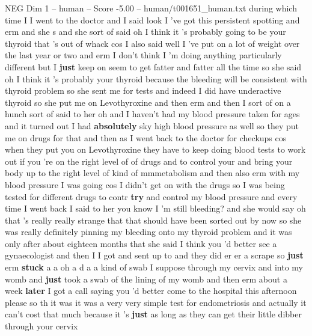 \begin{textsample}{NEG Dim 1 – human – Score -5.00 – human/t001651\_human.txt}  \label{ex:f1_neg_033}
during which time I I went to the doctor and I said look I 've got this persistent spotting and erm and she s and she sort of said oh I think it 's probably going to be your thyroid that 's out of whack cos I also said well I 've put on a lot of weight over the last year or two and erm I don't think I 'm doing anything particularly different but I \textbf{just} keep on seem to get fatter and fatter all the time so she said oh I think it 's probably your thyroid because the bleeding will be consistent with thyroid problem so she sent me for tests and indeed I did have underactive thyroid so she put me on Levothyroxine and then erm and then I sort of on a hunch sort of said to her oh and I haven't had my blood pressure taken for ages and it turned out I had \textbf{absolutely} sky high blood pressure as well so they put me on drugs for that and then as I went back to the doctor for checkups cos when they put you on Levothyroxine they have to keep doing blood tests to work out if you 're on the right level of of drugs and to control your and bring your body up to the right level of kind of mmmetabolism and then also erm with my blood pressure I was going cos I didn't get on with the drugs so I was being tested for different drugs to contr \textbf{try} and control my blood pressure and every time I went back I said to her you know I 'm still bleeding? and she would say oh that 's really really strange that that should have been sorted out by now so she was really definitely pinning my bleeding onto my thyroid problem and it was only after about eighteen months that she said I think you 'd better see a gynaecologist and then I I got and sent up to and they did er er a scrape so \textbf{just} erm \textbf{stuck} a a oh a d a a kind of swab I suppose through my cervix and into my womb and \textbf{just} took a swab of the lining of my womb and then erm about a week \textbf{later} I got a call saying you 'd better come to the hospital this afternoon please so th it was it was a very very simple test for endometriosis and actually it can't cost that much because it 's \textbf{just} as long as they can get their little dibber through your cervix

\end{textsample}
